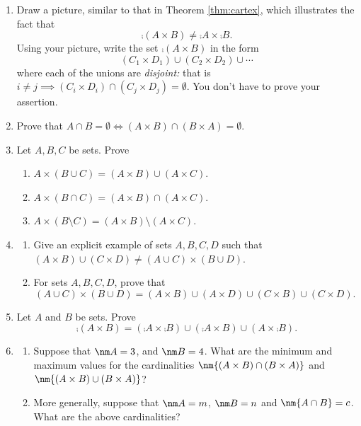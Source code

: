 \begin{enumerate}
	\item\label{ex:cartneg} Draw a picture, similar to that in Theorem \ref{thm:cartex}, which illustrates the fact that
	\[\comp{(A\times B)}\neq \comp A\times \comp B.\]
	Using your picture, write the set $\comp{(A\times B)}$ in the form
	\[(C_1\times D_1)\cup (C_2\times D_2)\cup\cdots\]
	where each of the unions are \emph{disjoint:} that is $i\neq j\implies (C_i\times D_i)\cap (C_j\times D_j)=\emptyset$. You don't have to prove your assertion.
		
	\item Prove that $A\cap B=\emptyset\iff (A\times B)\cap(B\times A)=\emptyset$.
	
	\item Let $A,B,C$ be sets. Prove
\begin{enumerate}
    \item $A \times (B \cup C) = (A \times B) \cup (A \times C)$.
    \item $A \times (B \cap C) = (A \times B) \cap (A \times C)$.
    \item $A \times (B \setminus C) = (A \times B) \setminus (A \times C)$.
\end{enumerate}

\item \begin{enumerate}
    \item Give an explicit example of sets $A,B,C,D$ such that $(A \times B) \cup (C \times D) \neq (A \cup C) \times (B \cup D)$.
    \item For sets $A,B,C,D$, prove that
    \[
        (A \cup C) \times (B \cup D) = (A \times B) \cup (A \times D) \cup (C \times B) \cup (C \times D).
    \]
\end{enumerate}

\item Let $A$ and $B$ be sets. Prove
\[
    \comp{(A \times B)} = (\comp{A} \times \comp{B}) \cup (\comp{A} \times B) \cup (A \times \comp{B}).
\]
	
  \item\begin{enumerate}
		\item Suppose that $\nm A=3$, and $\nm B=4$. What are the minimum and maximum values for the cardinalities $\nm{(A\times B)\cap(B\times A)}$ and $\nm{(A\times B)\cup(B\times A)}$?
		\item More generally, suppose that $\nm A=m$, $\nm B=n$ and $\nm{A\cap B}=c$. What are the above cardinalities?
	\end{enumerate}
	

\end{enumerate}
